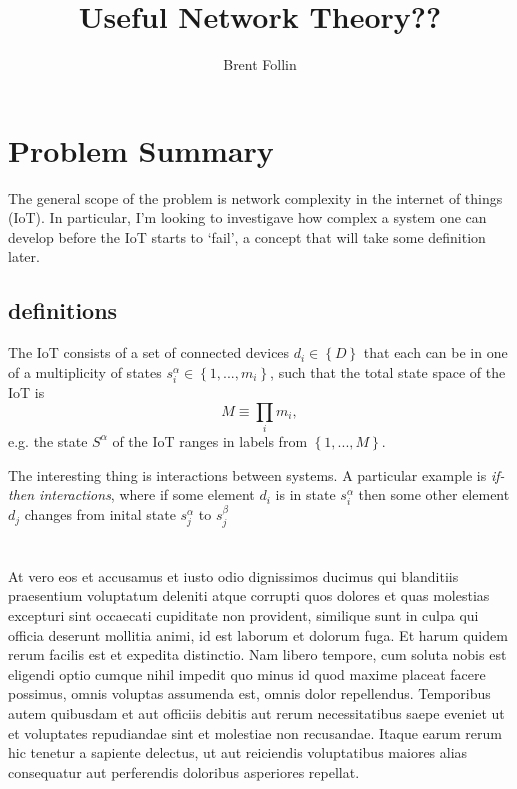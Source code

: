 \documentclass{article}
\title{Useful Network Theory??}
\author{Brent Follin}
\def\be{\begin{equation*}}
\def\ee{\end{equation*}}
\begin{document}
\maketitle

\section{Problem Summary} %
The general scope of the problem is network complexity in the internet of things (IoT). In particular, I'm looking to investigave how complex a system one can develop before the IoT starts to `fail', a concept that will take some definition later. 
\subsection{definitions}
The IoT consists of a set of connected devices $d_{i} \in \left\{D \right\}$ that each can be in one of a multiplicity of states $s^\alpha_i \in \left\{1, ..., m_i\right\}$, such that the total state space of the IoT is 
\be
M \equiv \prod_i m_i,
\ee
e.g. the state $S^\alpha$ of the IoT ranges in labels from $\left\{1, ..., M\right\}$.

The interesting thing is interactions between systems. A particular example is \textit{if-then interactions}, where if some element $d_i$ is in state $s^\alpha_i$ then some other element $d_j$ changes from inital state $s^\alpha_j$ to $s^\beta_j$

\section{} %
At vero eos et accusamus et iusto odio dignissimos ducimus qui blanditiis 
praesentium voluptatum deleniti atque corrupti quos dolores et quas 
molestias excepturi sint occaecati cupiditate non provident, similique sunt in 
culpa qui officia deserunt mollitia animi, id est laborum et dolorum fuga. Et 
harum quidem rerum facilis est et expedita distinctio. Nam libero tempore, cum 
soluta nobis est eligendi optio cumque nihil impedit quo minus id quod maxime 
placeat facere possimus, omnis voluptas assumenda est, omnis dolor repellendus.
 Temporibus autem quibusdam et aut officiis debitis aut rerum necessitatibus 
saepe eveniet ut et voluptates repudiandae sint et molestiae non recusandae. 
Itaque earum rerum hic tenetur a sapiente delectus, ut aut reiciendis 
voluptatibus maiores alias consequatur aut perferendis doloribus asperiores repellat.
\end{document}
